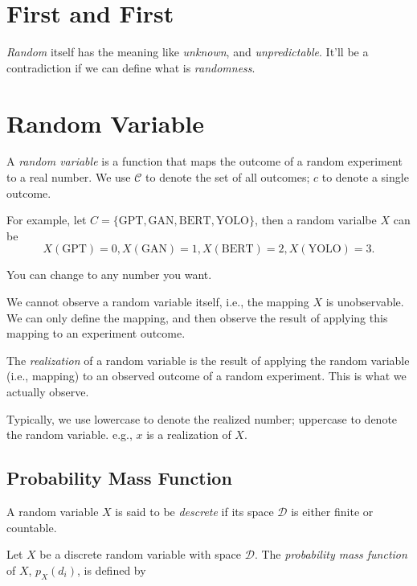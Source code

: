 \documentclass{article}
\begin{document}
    \section{First and First}

        \textit{Random} itself has the meaning like \textit{unknown}, and
        \textit{unpredictable}. It'll be a contradiction if we can define
        what is \textit{randomness}.

    \section{Random Variable}

        A \textit{random variable} is a function that maps the outcome of a
        random experiment to a real number. We use $ \mathcal{C} $ to
        denote the set of all outcomes; $ c $ to denote a single outcome.

        For example, let $ C =  \{ \text{GPT}, \text{GAN}, \text{BERT},
        \text{YOLO} \} $, then a random varialbe $ X $ can be
        \begin{equation*}
             X(\text{GPT}) = 0, X(\text{GAN}) = 1, X(\text{BERT}) = 2,
             X(\text{YOLO}) = 3.
        \end{equation*}

        You can change to any number you want.

        We cannot observe a random variable itself, i.e., the mapping $ X $
        is unobservable. We can only define the mapping, and then observe
        the result of applying this mapping to an experiment outcome.

        The \textit{realization} of a random variable is the result of
        applying the random variable (i.e., mapping) to an observed outcome
        of a random experiment. This is what we actually observe.

        Typically, we use lowercase to denote the realized number;
        uppercase to denote the random variable. e.g., $ x $ is a
        realization of $ X $.

        \subsection{Probability Mass Function}

            A random variable $ X $ is said to be \textit{descrete} if its
            space $ \mathcal{D} $ is either finite or countable.

            Let $ X $ be a discrete random variable with space $ \mathcal{D} $.
            The \textit{probability mass function} of $ X $, $ p_{X}(d_{i}) $,
            is defined by
\end{document}
